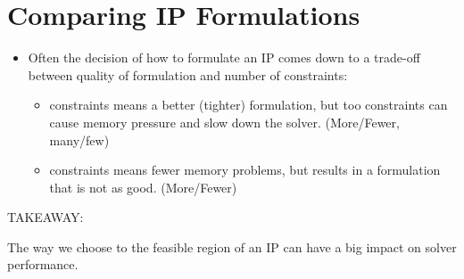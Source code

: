 \documentclass[11pt]{article}
\theoremstyle{definition}
\newcommand{\answerbox}[3]{%
  \fbox{%
    \begin{minipage}[#1]{#2}
      \hfill\vspace{#3}
    \end{minipage}
  }
}
\newcommand{\wordbox}{\answerbox{c}{1.2in}{.7cm}}
\newcommand{\catbox}{\answerbox{c}{.5in}{.7cm}}
\begin{document}
\vfill
\section{Comparing IP Formulations}


\begin{itemize}
\item Often the decision of how to formulate an IP comes down to a trade-off between quality of formulation and number of constraints:
\begin{itemize}
\item \wordbox constraints means a better (tighter) formulation, but too \catbox constraints can cause memory pressure and slow down the solver.  (More/Fewer, many/few)
\item \wordbox constraints means fewer memory problems, but results in a formulation that is not as good.  (More/Fewer)
\end{itemize}
\end{itemize}

\bigskip
TAKEAWAY:

\begin{tcolorbox}
The way we choose to \wordbox the feasible region of an IP can have a big impact on solver performance.
\end{tcolorbox}

\vfill
\end{document}
